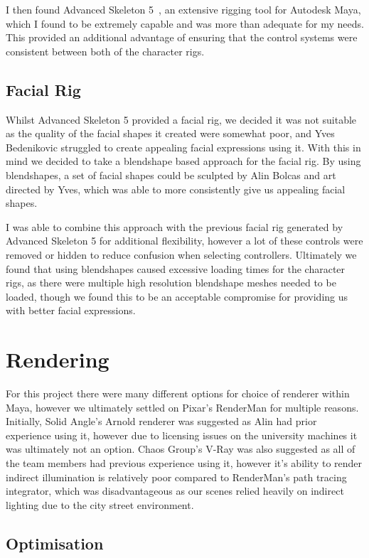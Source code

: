 \documentclass[11pt]{article}
\begin{document}
I then found Advanced Skeleton 5~\cite{advancedSkeleton}, an extensive rigging tool for Autodesk Maya, which I found to be extremely capable and was more than adequate for my needs. This provided an additional advantage of ensuring that the control systems were consistent between both of the character rigs.

\subsection{Facial Rig}

Whilst Advanced Skeleton 5 provided a facial rig, we decided it was not suitable as the quality of the facial shapes it created were somewhat poor, and Yves Bedenikovic struggled to create appealing facial expressions using it. With this in mind we decided to take a blendshape based approach for the facial rig. By using blendshapes, a set of facial shapes could be sculpted by Alin Bolcas and art directed by Yves, which was able to more consistently give us appealing facial shapes.

I was able to combine this approach with the previous facial rig generated by Advanced Skeleton 5 for additional flexibility, however a lot of these controls were removed or hidden to reduce confusion when selecting controllers. Ultimately we found that using blendshapes caused excessive loading times for the character rigs, as there were multiple high resolution blendshape meshes needed to be loaded, though we found this to be an acceptable compromise for providing us with better facial expressions.

\section{Rendering}

For this project there were many different options for choice of renderer within Maya, however we ultimately settled on Pixar's RenderMan for multiple reasons. Initially, Solid Angle's Arnold renderer was suggested as Alin had prior experience using it, however due to licensing issues on the university machines it was ultimately not an option. Chaos Group's V-Ray was also suggested as all of the team members had previous experience using it, however it's ability to render indirect illumination is relatively poor compared to RenderMan's path tracing integrator, which was disadvantageous as our scenes relied heavily on indirect lighting due to the city street environment.


\subsection{Optimisation}
\end{document}
